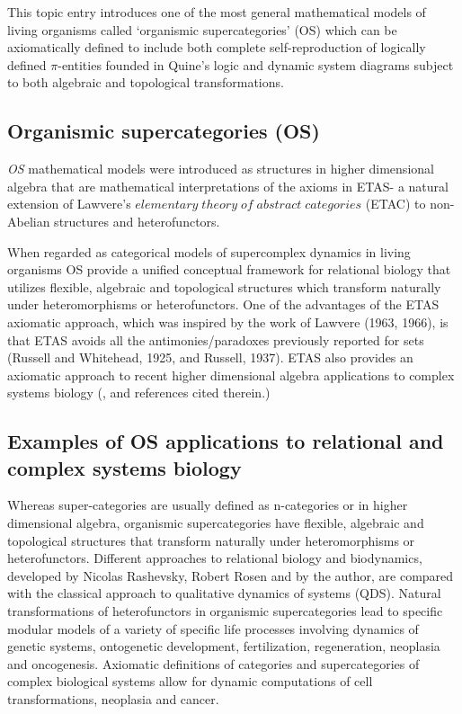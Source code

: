 \documentclass[12pt]{article}
\theoremstyle{plain}
\theoremstyle{definition}
\numberwithin{equation}{section}
\begin{document}
This topic entry introduces one of the most general mathematical models of living organisms
called `organismic supercategories' (OS) which can be axiomatically defined to include both 
complete self-reproduction of logically defined $\pi$-entities founded in Quine's logic
and dynamic system diagrams subject to both algebraic and topological transformations.

\subsection{Organismic supercategories (OS)} 
 \emph{OS} mathematical models were introduced as structures in higher dimensional algebra that are mathematical interpretations of the axioms in ETAS- a natural extension of Lawvere's $elementary\; theory\; of \; abstract \; categories$ (ETAC) to non-Abelian structures and heterofunctors.

 When regarded as categorical models of supercomplex dynamics in living organisms OS provide a unified conceptual framework for relational biology that utilizes flexible, algebraic and topological structures which transform naturally under heteromorphisms or heterofunctors. One of the advantages of the ETAS axiomatic approach, which was inspired by the work of Lawvere (1963, 1966), is that ETAS avoids all the antimonies/paradoxes previously reported for sets (Russell and Whitehead, 1925, and Russell, 1937). ETAS also provides an axiomatic approach to recent higher
dimensional algebra applications to complex systems biology (\cite{Bgg2}, \cite{BBGG1} and references cited therein.)


\subsection{Examples of OS applications to relational and complex systems biology}

Whereas super-categories are usually defined as n-categories or in higher dimensional algebra, organismic supercategories have flexible, algebraic and topological structures that transform naturally under heteromorphisms or heterofunctors. Different approaches to relational biology and biodynamics, developed by Nicolas Rashevsky, Robert Rosen and by the author, are compared with the classical approach to qualitative dynamics of systems (QDS). Natural transformations of heterofunctors in organismic supercategories lead to specific modular models of a variety of specific life processes involving dynamics of genetic systems, ontogenetic development, fertilization, regeneration, neoplasia and oncogenesis. Axiomatic definitions of categories and supercategories of complex biological systems allow for dynamic computations of cell transformations, neoplasia and cancer.
\end{document}
